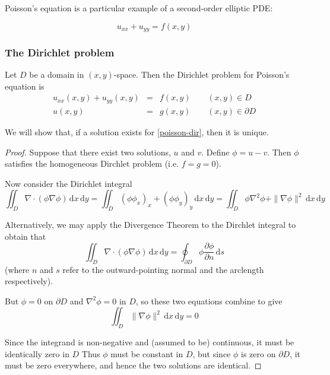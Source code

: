 \documentclass[10pt,fleqn]{article}
\newcommand{\diff}{\,\mathrm{d}}
\theoremstyle{definition} \newtheorem{defn}{Definition}[section]
\theoremstyle{plain}      \newtheorem{thm}[defn]{Theorem}
\theoremstyle{plain}      \newtheorem{lem}[defn]{Lemma}
\theoremstyle{definition} \newtheorem{prop}[defn]{Proposition}
\theoremstyle{definition} \newtheorem{cor}[defn]{Corollary}
\theoremstyle{definition} \newtheorem{ex}[defn]{Example}
\theoremstyle{definition} \newtheorem{rem}[defn]{Remark}
\begin{document}
Poisson's equation is a particular example of a second-order elliptic PDE:{
\begin{equation}
    u_{xx}+u_{yy}=f(x,y)
\end{equation}


\subsubsection{The Dirichlet problem}

Let $D$ be a domain in $(x,y)$-space.
Then the Dirichlet problem for Poisson's equation is
\begin{equation}\label{poisson-dir}
    \begin{array}{rcl}
        u_{xx}(x,y)+u_{yy}(x,y) &=& f(x,y)\qquad (x,y)\in D\\
        u(x,y) &=& g(x,y)\qquad (x,y)\in\partial D
    \end{array}
\end{equation}

We will show that, if a solution exists for \ref{poisson-dir}, then it is unique.

\begin{proof}
    Suppose that there exist two solutions, $u$ and $v$.
    Define $\phi=u-v$.
    Then $\phi$ satisfies the homogeneous Dirchlet problem (i.e. $f=g=0$).

    Now consider the Dirichlet integral
    \[
        \iint_D{\nabla}\cdot(\phi\nabla\phi)\diff x\diff y=
        \iint_D(\phi\phi_x)_x+(\phi\phi_y)_y\diff x\diff y=
        \iint_D\phi\nabla^2\phi+\|\nabla\phi\|^2\diff x\diff y
    \]

    Alternatively, we may apply the Divergence Theorem to the Dirchlet integral to obtain that
    \[
        \iint_D{\nabla}\cdot(\phi\nabla\phi)\diff x\diff y=
        \oint_{\partial D}\phi\frac{\partial\phi}{\partial n}\diff s
    \]
    (where $n$ and $s$ refer to the outward-pointing normal and the arclength respectively).

    But $\phi=0$ on $\partial D$ and $\nabla^2\phi=0$ in $D$, so these two equations combine to give
    \[
        \iint_D\|\nabla\phi\|^2\diff x\diff y=0
    \]

    Since the integrand is non-negative and (assumed to be) continuous, it must be identically zero in $D$
    Thus $\phi$ must be constant in $D$, but since $\phi$ is zero on $\partial D$, it must be zero everywhere, and hence the two solutions are identical.
\end{proof}


}
\end{document}
